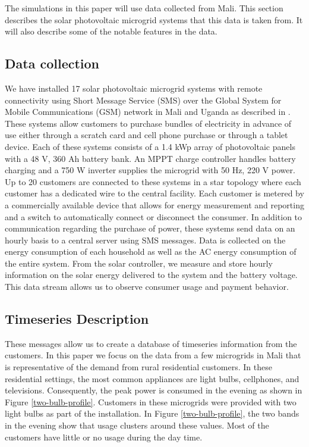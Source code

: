 \documentclass[conference]{IEEEtran}
\begin{document}
The simulations in this paper will use data collected from 
Mali.
This section describes the solar photovoltaic microgrid 
systems that this data is taken from.
It will also describe some of the notable features in the data.

\subsection{Data collection}
We have installed 17 solar photovoltaic microgrid systems 
with remote connectivity using Short Message Service (SMS)
over the Global System for Mobile Communications (GSM) network
in Mali and Uganda as described in \cite{ICTD}.
These systems allow customers to purchase bundles of 
electricity in advance of use either through a scratch card and 
cell phone purchase or through a tablet device.
Each of these systems consists of a 1.4 kWp array of photovoltaic
panels with a 48 V, 360 Ah battery bank.
An MPPT charge controller handles battery charging and a
750 W inverter supplies the microgrid with 50 Hz, 220 V power.
Up to 20 customers are connected to these systems in a star
topology where each customer has a dedicated wire to the
central facility.
Each customer is metered by a commercially available device that
allows for energy measurement and reporting and a switch to
automatically connect or disconnect the consumer.
In addition to communication regarding the purchase of power,
these systems send data on an hourly basis to a central server
using SMS messages.
Data is collected on the energy consumption of each household
as well as the AC energy consumption of the entire system.
From the solar controller, we measure and store hourly information
on the solar energy delivered to the system and the battery
voltage.
This data stream allows us to observe consumer usage and payment
behavior.

\subsection{Timeseries Description}
These messages allow us to create a database of timeseries
information from the customers.
In this paper we focus on the data from a few microgrids in 
Mali that is representative of the demand from rural residential
customers.
In these residential settings, the most common appliances are
light bulbs, cellphones, and televisions.
Consequently, the peak power is consumed in the evening
as shown in Figure \ref{two-bulb-profile}.
Customers in these microgrids were provided with two light bulbs
as part of the installation.
In Figure \ref{two-bulb-profile}, the two bands in the evening show
that usage clusters around these values.
Most of the customers have little or no usage during the day time.
\end{document}
